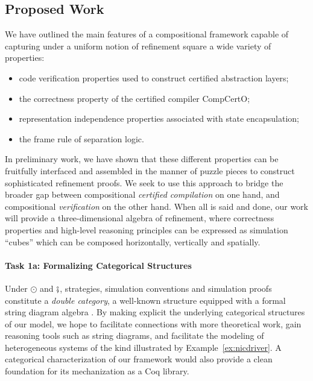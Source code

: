 
\subsection{Proposed Work}

We have outlined the main features of a compositional framework
capable of capturing under a uniform notion of refinement square
a wide variety of properties:
\begin{itemize}
  \item code verification properties used to construct certified abstraction layers;
  \item the correctness property of the certified compiler CompCertO;
  \item representation independence properties associated with state encapsulation;
  \item the frame rule of separation logic.
\end{itemize}
In preliminary work,
we have shown that these different properties
can be fruitfully interfaced and assembled in the manner of puzzle pieces
to construct sophisticated refinement proofs.
%
We seek to use this approach
to bridge the broader gap between
compositional \emph{certified compilation} on one hand, and
compositional \emph{verification} on the other hand.
When all is said and done,
our work will provide a three-dimensional algebra of refinement,
where correctness properties and high-level reasoning principles
can be expressed as simulation ``cubes''
which can be composed horizontally, vertically and spatially.

\vspace*{-2ex}
\paragraph*{Task 1a: Formalizing Categorical Structures}

Under $\odot$ and $\fatsemi$,
strategies, simulation conventions and simulation proofs
constitute a \emph{double category},
a well-known structure equipped with a formal string diagram algebra
\cite{dcsd}.
By making explicit the underlying categorical structures
of our model,
we hope to facilitate connections with more theoretical work,
gain reasoning tools such as string diagrams,
and facilitate the modeling of heterogeneous systems
of the kind illustrated by Example~\ref{ex:nicdriver}.
A categorical characterization of our framework
would also provide a clean foundation for its mechanization
as a Coq library.

